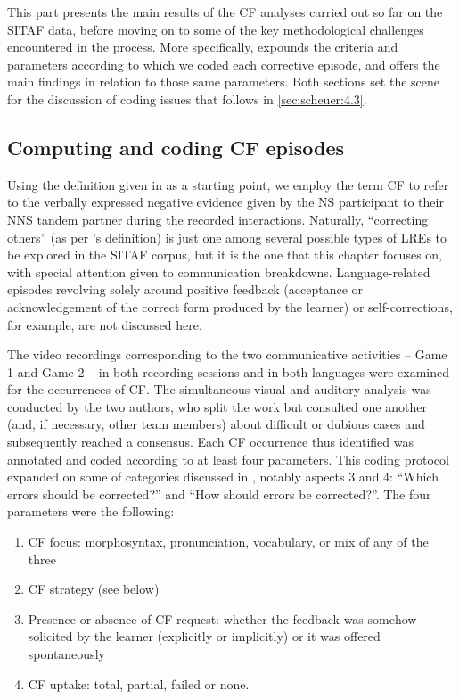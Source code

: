 \documentclass[output=paper,colorlinks,citecolor=brown,modfonts,nonflat]{../langscibook}
\begin{document}
This part presents the main results of the CF analyses carried out so far on the SITAF data, before moving on to some of the key methodological challenges encountered in the process. More specifically,  expounds the criteria and parameters according to which we coded each corrective episode, and  offers the main findings in relation to those same parameters. Both sections set the scene for the discussion of coding issues that follows in \ref{sec:scheuer:4.3}.

\subsection{Computing and coding CF episodes}\label{sec:scheuer:4.1}

Using the definition given in  as a starting point, we employ the term CF to refer to the verbally expressed negative evidence given by the NS participant to their NNS tandem partner during the recorded interactions. Naturally, “correcting others” (as per \citeauthor{SwainLapkin1998}'s \citeyear{SwainLapkin1998} definition) is just one among several possible types of LREs to be explored in the SITAF corpus, but it is the one that this chapter focuses on, with special attention given to communication breakdowns. Language-related episodes revolving solely around positive feedback (acceptance or acknowledgement of the correct form produced by the learner) or self-corrections, for example, are not discussed here.

The video recordings corresponding to the two communicative activities – Game 1 and Game 2 – in both recording sessions and in both languages were examined for the occurrences of CF. The simultaneous visual and auditory analysis was conducted by the two authors, who split the work but consulted one another (and, if necessary, other team members) about difficult or dubious cases and subsequently reached a consensus. Each CF occurrence thus identified was annotated and coded according to at least four parameters. This coding protocol expanded on some of  categories discussed in , notably aspects 3 and 4: “Which errors should be corrected?” and “How should errors be corrected?”. The four parameters were the following:

\begin{enumerate}
\item CF focus: morphosyntax, pronunciation, vocabulary, or mix of any of the three
\item CF strategy (see below)
\item Presence or absence of CF request: whether the feedback was somehow solicited by the learner (explicitly or implicitly) or it was offered spontaneously
\item CF uptake: total, partial, failed or none.
\end{enumerate}
\end{document}

